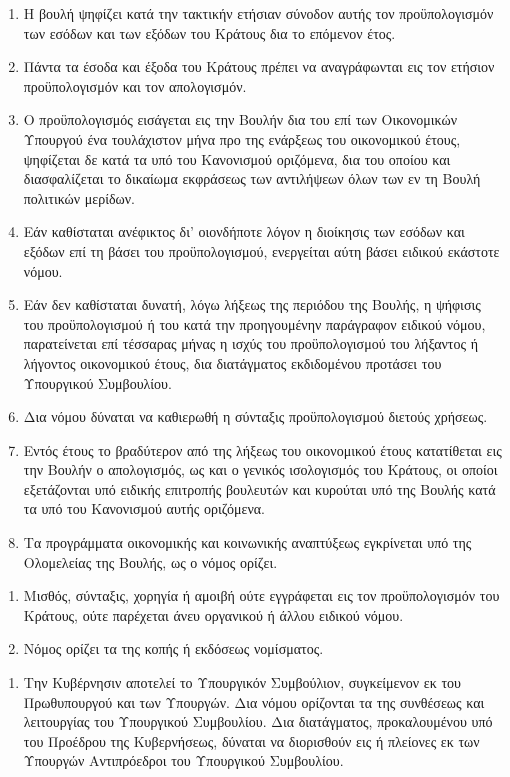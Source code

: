 \documentclass[twoside, a4paper, 10pt]{article}
\begin{document}
\begin{multicols}{2}
\begin{enumerate}
\begin{BigQuote}
\begin{enumerate}
  \item[1.] Η βουλή ψηφίζει κατά την τακτικήν ετήσιαν σύνοδον αυτής τον προϋπολογισμόν των εσόδων και των εξόδων του Κράτους δια το επόμενον έτος.
  \item[2.] Πάντα τα έσοδα και έξοδα του Κράτους  πρέπει να αναγράφωνται εις τον ετήσιον προϋπολογισμόν και τον απολογισμόν.
  \item[3.] Ο προϋπολογισμός εισάγεται εις την Βουλήν δια του επί των Οικονομικών Υπουργού ένα τουλάχιστον μήνα προ της ενάρξεως του οικονομικού έτους, ψηφίζεται δε κατά τα υπό του Κανονισμού οριζόμενα, δια του οποίου και διασφαλίζεται το δικαίωμα εκφράσεως των αντιλήψεων όλων των εν τη Βουλή πολιτικών μερίδων.
  \item[4.] Εάν καθίσταται ανέφικτος δι' οιονδήποτε  λόγον η διοίκησις των εσόδων και εξόδων επί τη βάσει του προϋπολογισμού, ενεργείται αύτη βάσει ειδικού εκάστοτε νόμου.
  \item[5.] Εάν δεν καθίσταται δυνατή, λόγω λήξεως της περιόδου της Βουλής, η ψήφισις του προϋπολογισμού ή του κατά την προηγουμένην παράγραφον ειδικού νόμου, παρατείνεται επί τέσσαρας μήνας η ισχύς του προϋπολογισμού του λήξαντος  ή λήγοντος οικονομικού έτους, δια διατάγματος εκδιδομένου προτάσει του Υπουργικού Συμβουλίου.
  \item[6.] Δια νόμου δύναται να καθιερωθή η σύνταξις προϋπολογισμού διετούς χρήσεως.
  \item[7.] Εντός έτους το βραδύτερον  από της λήξεως του οικονομικού έτους κατατίθεται εις την Βουλήν ο απολογισμός, ως και ο γενικός ισολογισμός του Κράτους, οι οποίοι εξετάζονται υπό ειδικής επιτροπής βουλευτών και κυρούται υπό της Βουλής κατά τα υπό του Κανονισμού αυτής οριζόμενα.
  \item[7.] Τα προγράμματα οικονομικής και κοινωνικής αναπτύξεως εγκρίνεται υπό της Ολομελείας της Βουλής, ως ο νόμος ορίζει.  
\end{enumerate}

\begin{enumerate}
  \item[1.] Μισθός, σύνταξις, χορηγία ή αμοιβή ούτε εγγράφεται εις τον προϋπολογισμόν του Κράτους, ούτε παρέχεται άνευ οργανικού ή άλλου ειδικού νόμου.
  \item[2.] Νόμος ορίζει τα της κοπής ή εκδόσεως νομίσματος.
\end{enumerate}

\begin{enumerate}
  \item[1.] Την Κυβέρνησιν αποτελεί το Υπουργικόν Συμβούλιον, συγκείμενον εκ του Πρωθυπουργού και των Υπουργών. Δια νόμου ορίζονται τα της συνθέσεως και λειτουργίας  του Υπουργικού Συμβουλίου. Δια διατάγματος, προκαλουμένου υπό του Προέδρου της Κυβερνήσεως, δύναται να διορισθούν εις ή πλείονες εκ των Υπουργών Αντιπρόεδροι του Υπουργικού Συμβουλίου.


\end{enumerate}
\end{BigQuote}
\end{enumerate}
\end{multicols}
\end{document}
